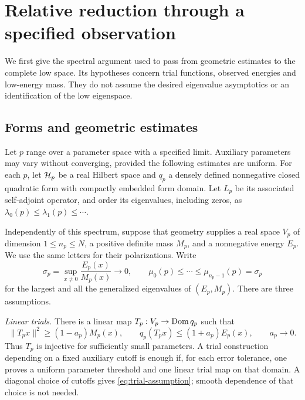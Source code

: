 \section{Relative reduction through a specified observation}
\label{sec:relative}

We first give the spectral argument used to pass from geometric estimates
to the complete low space. Its hypotheses concern trial functions,
observed energies and low-energy mass. They do not assume the desired
eigenvalue asymptotics or an identification of the low eigenspace.

\subsection{Forms and geometric estimates}

Let $p$ range over a parameter space with a specified limit. Auxiliary
parameters may vary without converging, provided the following estimates
are uniform. For each $p$, let $\mathcal H_p$ be a real Hilbert space and
$q_p$ a densely defined nonnegative closed quadratic form with compactly
embedded form domain. Let $L_p$ be its associated self-adjoint operator,
and order its eigenvalues, including zeros, as
$\lambda_0(p)\le\lambda_1(p)\le\cdots$.

Independently of this spectrum, suppose that geometry supplies a real
space $V_p$ of dimension $1\le n_p\le N$, a positive definite mass $M_p$,
and a nonnegative energy $E_p$. We use the same letters for their
polarizations. Write
\begin{equation}\label{eq:model-largest}
 \sigma_p=\sup_{x\ne0}\frac{E_p(x)}{M_p(x)}\longrightarrow0,\qquad
 \mu_0(p)\le\cdots\le\mu_{n_p-1}(p)=\sigma_p
\end{equation}
for the largest and all the generalized eigenvalues of $(E_p,M_p)$.
There are three assumptions.

\smallskip\noindent
\emph{Linear trials.}
There is a linear map $T_p:V_p\to\operatorname{Dom} q_p$ such that
\begin{equation}\label{eq:trial-assumption}
 \|T_px\|^2\ge(1-a_p)M_p(x),\qquad
 q_p(T_px)\le(1+a_p)E_p(x),\qquad a_p\to0.
\end{equation}
Thus $T_p$ is injective for sufficiently small parameters. A trial
construction depending on a fixed auxiliary cutoff is enough if, for
each error tolerance, one proves a uniform parameter threshold and one
linear trial map on that domain. A diagonal choice of cutoffs gives
\eqref{eq:trial-assumption}; smooth dependence of that choice is not
needed.

